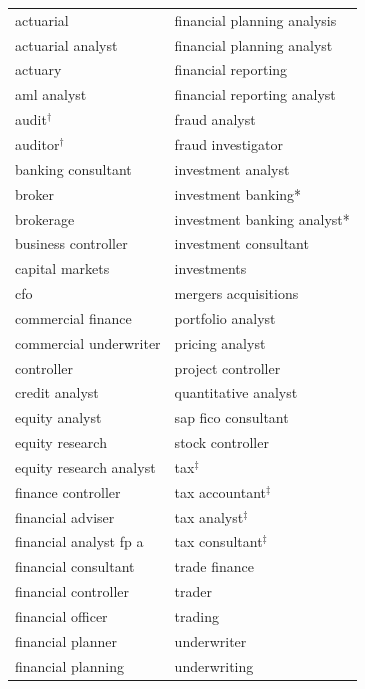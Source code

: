 
\begin{tabular}{p{7cm}p{7cm}}
\toprule
 & \\
\midrule
actuarial & financial planning analysis \\
actuarial analyst & financial planning analyst \\
actuary & financial reporting \\
aml analyst & financial reporting analyst \\
audit$^\dagger$ & fraud analyst \\
auditor$^\dagger$ & fraud investigator \\
banking consultant & investment analyst \\
broker & investment banking* \\
brokerage & investment banking analyst* \\
business controller & investment consultant \\
capital markets & investments \\
cfo & mergers acquisitions \\
commercial finance & portfolio analyst \\
commercial underwriter & pricing analyst \\
controller & project controller \\
credit analyst & quantitative analyst \\
equity analyst & sap fico consultant \\
equity research & stock controller \\
equity research analyst & tax$^\ddagger$ \\
finance controller & tax accountant$^\ddagger$ \\
financial adviser & tax analyst$^\ddagger$ \\
financial analyst fp a & tax consultant$^\ddagger$ \\
financial consultant & trade finance \\
financial controller & trader \\
financial officer & trading \\
financial planner & underwriter \\
financial planning & underwriting \\

\bottomrule
\end{tabular}
